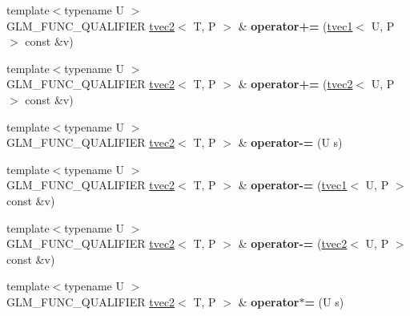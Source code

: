 \begin{DoxyCompactItemize}
\item 
\hypertarget{structglm_1_1tvec2_a977134a069d9e6fec28d33204ed68019}{{\footnotesize template$<$typename U $>$ }\\G\-L\-M\-\_\-\-F\-U\-N\-C\-\_\-\-Q\-U\-A\-L\-I\-F\-I\-E\-R \hyperlink{structglm_1_1tvec2}{tvec2}$<$ T, P $>$ \& {\bfseries operator+=} (\hyperlink{structglm_1_1tvec1}{tvec1}$<$ U, P $>$ const \&v)}\label{structglm_1_1tvec2_a977134a069d9e6fec28d33204ed68019}

\item 
\hypertarget{structglm_1_1tvec2_aa986a740e1ba345aa71814bb2a08e597}{{\footnotesize template$<$typename U $>$ }\\G\-L\-M\-\_\-\-F\-U\-N\-C\-\_\-\-Q\-U\-A\-L\-I\-F\-I\-E\-R \hyperlink{structglm_1_1tvec2}{tvec2}$<$ T, P $>$ \& {\bfseries operator+=} (\hyperlink{structglm_1_1tvec2}{tvec2}$<$ U, P $>$ const \&v)}\label{structglm_1_1tvec2_aa986a740e1ba345aa71814bb2a08e597}

\item 
\hypertarget{structglm_1_1tvec2_a7ecf8c6d786870f2d7d68e3b8a463a81}{{\footnotesize template$<$typename U $>$ }\\G\-L\-M\-\_\-\-F\-U\-N\-C\-\_\-\-Q\-U\-A\-L\-I\-F\-I\-E\-R \hyperlink{structglm_1_1tvec2}{tvec2}$<$ T, P $>$ \& {\bfseries operator-\/=} (U s)}\label{structglm_1_1tvec2_a7ecf8c6d786870f2d7d68e3b8a463a81}

\item 
\hypertarget{structglm_1_1tvec2_a9a7beb6222ef80a7f3cf2e9931182445}{{\footnotesize template$<$typename U $>$ }\\G\-L\-M\-\_\-\-F\-U\-N\-C\-\_\-\-Q\-U\-A\-L\-I\-F\-I\-E\-R \hyperlink{structglm_1_1tvec2}{tvec2}$<$ T, P $>$ \& {\bfseries operator-\/=} (\hyperlink{structglm_1_1tvec1}{tvec1}$<$ U, P $>$ const \&v)}\label{structglm_1_1tvec2_a9a7beb6222ef80a7f3cf2e9931182445}

\item 
\hypertarget{structglm_1_1tvec2_a77a58d01579458e0a09dcbd7a174592c}{{\footnotesize template$<$typename U $>$ }\\G\-L\-M\-\_\-\-F\-U\-N\-C\-\_\-\-Q\-U\-A\-L\-I\-F\-I\-E\-R \hyperlink{structglm_1_1tvec2}{tvec2}$<$ T, P $>$ \& {\bfseries operator-\/=} (\hyperlink{structglm_1_1tvec2}{tvec2}$<$ U, P $>$ const \&v)}\label{structglm_1_1tvec2_a77a58d01579458e0a09dcbd7a174592c}

\item 
\hypertarget{structglm_1_1tvec2_a02ec511a8c33fd12c63d86aa44bc388c}{{\footnotesize template$<$typename U $>$ }\\G\-L\-M\-\_\-\-F\-U\-N\-C\-\_\-\-Q\-U\-A\-L\-I\-F\-I\-E\-R \hyperlink{structglm_1_1tvec2}{tvec2}$<$ T, P $>$ \& {\bfseries operator$\ast$=} (U s)}\label{structglm_1_1tvec2_a02ec511a8c33fd12c63d86aa44bc388c}


\end{DoxyCompactItemize}
